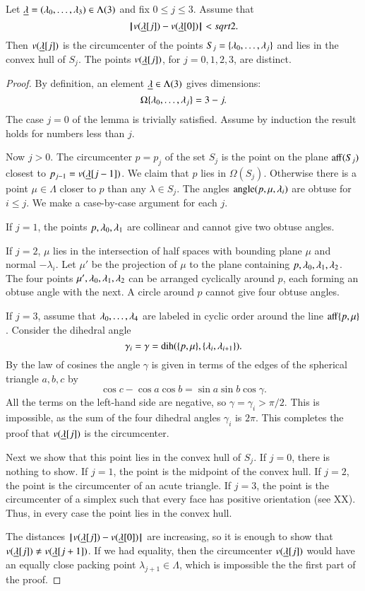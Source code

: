 \begin{lemma}\label{lemma:v2} Let ${\underline{\lambda}}=(\lambda_0,\ldots,\lambda_3)\in\Lambda(3)$ and fix $0\le j\le 3$.  Assume that
$$
{\hskip0.1em|\hskip-0.15em|\hskip0.1em}v({\underline{\lambda}}[j])  -  v({\underline{\lambda}}[0]){\hskip0.1em|\hskip-0.15em|\hskip0.1em} < sqrt2.
$$
Then $v({\underline{\lambda}}[j])$ is the circumcenter of the points $S_j =\{\lambda_0,\ldots,\lambda_j\}$ and
lies in the convex hull of $S_j$.  The points $v({\underline{\lambda}}[j])$, for $j=0,1,2,3$, are distinct.
\end{lemma}

\begin{proof} By definition, an element ${\underline{\lambda}}\in\Lambda(3)$ gives dimensions: 
$$\Omega\{\lambda_0,\ldots,\lambda_j\} = 3-j.$$  The case $j=0$ of the lemma is trivially
satisfied.  Assume by induction the result holds for numbers less than $j$.

Now $j>0$.
The circumcenter $p=p_{j}$ of the set $S_{j}$ is the point on the plane ${\operatorname{aff}}(S_{j})$
closest to $p_{j-1}=v({\underline{\lambda}}[j-1])$.  We claim that $p$ lies in $\Omega(S_{j})$.  Otherwise
there is a point $\mu\in\Lambda$ closer to $p$ than any $\lambda\in S_{j}$.  
The angles ${{\operatorname{angle}}(p,{\mu,\lambda_i})}$ are obtuse for $i\le j$.  We make a case-by-case
argument for each $j$.

If $j=1$, the points $p,\lambda_0,\lambda_1$ are collinear and cannot give two obtuse angles.

If $j=2$, $\mu$ lies in the intersection of half spaces with bounding plane $\mu$
and normal $-\lambda_i$.  Let $\mu'$ be the projection of $\mu$ to the plane containing
$p,\lambda_0,\lambda_1,\lambda_2$. The four points $\mu',\lambda_0,\lambda_1,\lambda_2$ can be arranged
cyclically around $p$, each forming an obtuse angle with the next.  A circle around $p$
cannot give four obtuse angles.


If $j=3$, assume that $\lambda_0,\ldots,\lambda_4$ are labeled in cyclic order around the line
${\operatorname{aff}}\{p,\mu\}$.  Consider the dihedral angle 
  $$
  \gamma_i=\gamma=\operatorname{dih}(\{p,\mu\},\{\lambda_i,\lambda_{i+1}\}).
  $$
By the law of cosines the angle $\gamma$ is given in terms of the edges of the spherical
triangle $a,b,c$ by
$$
  \cos c - \cos a \cos b = \sin a \sin b \cos \gamma.
$$
All the terms on the left-hand side are negative, so $\gamma =\gamma_i > \pi/2$.
This is impossible, as the sum of the four dihedral angles $\gamma_i$ is $2\pi$.
This completes the proof that $v({\underline{\lambda}}[j])$ is the circumcenter.

Next we show that this point lies in the convex hull of $S_j$.
If $j=0$, there is nothing to show.  If $j=1$, the point is the midpoint of the convex hull.
If $j=2$, the point is the circumcenter of an acute triangle.  If $j=3$, the point is the
circumcenter of a simplex such that every face has positive orientation (see XX).  Thus,
in every case the point lies in the convex hull.

The distances ${\hskip0.1em|\hskip-0.15em|\hskip0.1em}v({\underline{\lambda}}[j]) - v({\underline{\lambda}}[0]){\hskip0.1em|\hskip-0.15em|\hskip0.1em}$ are increasing, so it is enough to show
that $v({\underline{\lambda}}[j])\ne v({\underline{\lambda}}[j+1])$.  If we had equality, then the circumcenter $v({\underline{\lambda}}[j])$
would have an equally close packing point $\lambda_{j+1}\in\Lambda$, which is impossible
the the first part of the proof.
\end{proof}

